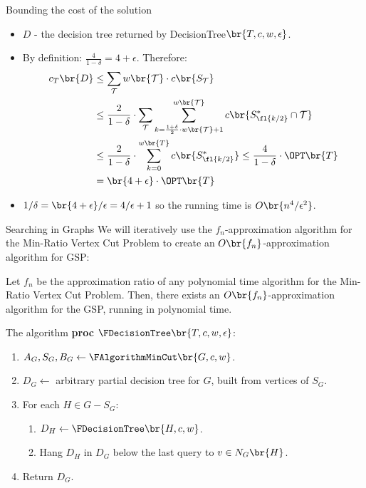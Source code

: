 \begin{frame}{Bounding the cost of the solution }
\begin{itemize}
    \item $D$ - the decision tree returned by DecisionTree$\br{T,c,w,\epsilon}$.
    \pause 
    \item By definition: $\frac{4}{1-\delta}=4+\epsilon$. Therefore:\pause
    \begin{align*}
            c_T\br{D} &\leq \sum_{\mathcal{T}} w\br{\mathcal{T}}\cdot c\br{S_\mathcal{T}}
            \\&\leq 
            \frac{2}{1-\delta}\cdot\sum_{\mathcal{T}}\sum_{k=\frac{1+\delta}{2}\cdot w\br{\mathcal{T}}+1}^{w\br{\mathcal{T}}}c\br{S_{\fl{k/2}}^*\cap \mathcal{T}}\\
            &\leq \frac{2}{1-\delta}\cdot\sum_{k=0}^{w\br{T}}c\br{S_{\fl{k/2}}^*}\leq \frac{4}{1-\delta}\cdot\OPT\br{T} 
            \\&= \br{4+\epsilon}\cdot\OPT\br{T}
    \end{align*}
    \pause
    \item $1/\delta=\br{4+\epsilon}/\epsilon=4/\epsilon+1$ so the running time is $O\br{n^4/\epsilon^2}$.
\end{itemize} 
\end{frame}

\begin{frame}{Searching in Graphs}
We will iteratively use the $f_n$-approximation algorithm for the Min-Ratio Vertex Cut Problem to create an $O\br{f_n}$-approximation algorithm for GSP:
\pause
\begin{theorem}
    Let $f_n$ be the approximation ratio of any polynomial time algorithm for the Min-Ratio Vertex Cut Problem. Then, there exists an $O\br{f_n}$-approximation algorithm for the GSP, running in polynomial time.
\end{theorem}
    
\end{frame}

\begin{frame}{The algorithm}
\textbf{proc} $\FDecisionTree\br{T,c,w,\epsilon}$:
\begin{enumerate}
    \item $A_G,S_G, B_G\gets\FAlgorithmMinCut\br{G, c, w}$.
    \item $D_G\gets$ arbitrary partial decision tree for $G$, built from vertices of $S_G$.
    \item For each $H\in G-S_G$:
    \begin{enumerate}
        \item $D_H\gets \FDecisionTree\br{H, c, w}$.
        \item Hang $D_H$ in $D_G$ below the last query to $v\in N_G\br{H}$.
    \end{enumerate}
    \item Return $D_G$.
\end{enumerate}
\end{frame}


